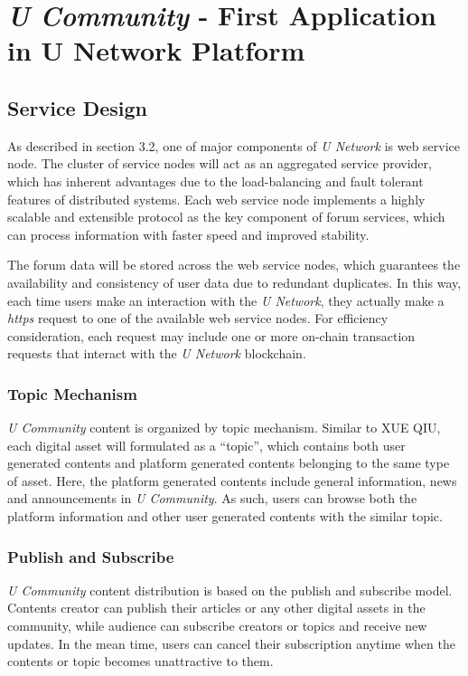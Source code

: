 \chapter{\emph{U Community} - First Application in U Network Platform}
\section{Service Design}

As described in section 3.2, one of major components of \emph{U Network} is web service node. The cluster of service nodes will act as an aggregated service provider, which has inherent advantages due to the load-balancing and fault tolerant features of distributed systems. Each web service node implements a highly scalable and extensible protocol as the key component of forum services, which can process information with faster speed and improved stability. 

The forum data will be stored across the web service nodes, which guarantees the availability and consistency of user data due to redundant duplicates. In this way, each time users make an interaction with the \emph{U Network}, they actually make a \emph{https} request to one of the available web service nodes. For efficiency consideration, each request may include one or more on-chain transaction requests that interact with the \emph{U Network} blockchain. 
\subsection{Topic Mechanism}
\emph{U Community} content is organized by topic mechanism. Similar to XUE QIU\cite{xueqiu}, each digital asset will formulated as a ``topic'', which contains both user generated contents and platform generated contents belonging to the same type of asset. Here, the platform generated contents include general information, news and announcements in \emph{U Community}. As such, users can browse both the platform information and other user generated contents with the similar topic.  
\subsection{Publish and Subscribe}
\emph{U Community} content distribution is based on the publish and subscribe model. Contents creator can publish their articles or any other digital assets in the community, while audience can subscribe creators or topics and receive new updates. In the mean time, users can cancel their subscription anytime when the contents or topic becomes unattractive to them. 
